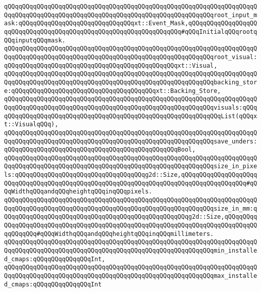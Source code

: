 \verb|qQQqqQQqqQQqqQQqqQQqqQQqqQQqqQQqqQQqqQQqqQQqqQQqqQQqqQQqqQQqqQQqqQQqqQQqqQQqqQQqqQQqqQQqqQQqqQQqqQQqqQQqqQQqqQQqqQQqqQQqqQQqqQQqroot_input_mask:qQQqqQQqqQQqqQQqqQQqqQQqqQQqqQQqxt::Event_Mask,qQQqqQQqqQQqqQQqqQQqqQQqqQQqqQQqqQQqqQQqqQQqqQQqqQQqqQQqqQQqqQQqqQQq#qQQqInitialqQQqrootqQQqinputqQQqmask.|\newline
\newline
\verb|qQQqqQQqqQQqqQQqqQQqqQQqqQQqqQQqqQQqqQQqqQQqqQQqqQQqqQQqqQQqqQQqqQQqqQQqqQQqqQQqqQQqqQQqqQQqqQQqqQQqqQQqqQQqqQQqqQQqqQQqqQQqqQQqroot_visual:qQQqqQQqqQQqqQQqqQQqqQQqqQQqqQQqqQQqqQQqqQQqqQQqxt::Visual,|\newline
\verb|qQQqqQQqqQQqqQQqqQQqqQQqqQQqqQQqqQQqqQQqqQQqqQQqqQQqqQQqqQQqqQQqqQQqqQQqqQQqqQQqqQQqqQQqqQQqqQQqqQQqqQQqqQQqqQQqqQQqqQQqqQQqqQQqbacking_store:qQQqqQQqqQQqqQQqqQQqqQQqqQQqqQQqqQQqqQQqxt::Backing_Store,|\newline
\newline
\verb|qQQqqQQqqQQqqQQqqQQqqQQqqQQqqQQqqQQqqQQqqQQqqQQqqQQqqQQqqQQqqQQqqQQqqQQqqQQqqQQqqQQqqQQqqQQqqQQqqQQqqQQqqQQqqQQqqQQqqQQqqQQqqQQqvisuals:qQQqqQQqqQQqqQQqqQQqqQQqqQQqqQQqqQQqqQQqqQQqqQQqqQQqqQQqqQQqqQQqList(qQQqxt::VisualqQQq),|\newline
\verb|qQQqqQQqqQQqqQQqqQQqqQQqqQQqqQQqqQQqqQQqqQQqqQQqqQQqqQQqqQQqqQQqqQQqqQQqqQQqqQQqqQQqqQQqqQQqqQQqqQQqqQQqqQQqqQQqqQQqqQQqqQQqqQQqsave_unders:qQQqqQQqqQQqqQQqqQQqqQQqqQQqqQQqqQQqqQQqqQQqqQQqBool,|\newline
\newline
\verb|qQQqqQQqqQQqqQQqqQQqqQQqqQQqqQQqqQQqqQQqqQQqqQQqqQQqqQQqqQQqqQQqqQQqqQQqqQQqqQQqqQQqqQQqqQQqqQQqqQQqqQQqqQQqqQQqqQQqqQQqqQQqqQQqsize_in_pixels:qQQqqQQqqQQqqQQqqQQqqQQqqQQqqQQqqQQqg2d::Size,qQQqqQQqqQQqqQQqqQQqqQQqqQQqqQQqqQQqqQQqqQQqqQQqqQQqqQQqqQQqqQQqqQQqqQQqqQQqqQQqqQQqqQQq#qQQqWidthqQQqandqQQqheightqQQqinqQQqpixels.|\newline
\verb|qQQqqQQqqQQqqQQqqQQqqQQqqQQqqQQqqQQqqQQqqQQqqQQqqQQqqQQqqQQqqQQqqQQqqQQqqQQqqQQqqQQqqQQqqQQqqQQqqQQqqQQqqQQqqQQqqQQqqQQqqQQqqQQqsize_in_mm:qQQqqQQqqQQqqQQqqQQqqQQqqQQqqQQqqQQqqQQqqQQqqQQqqQQqg2d::Size,qQQqqQQqqQQqqQQqqQQqqQQqqQQqqQQqqQQqqQQqqQQqqQQqqQQqqQQqqQQqqQQqqQQqqQQqqQQqqQQqqQQqqQQq#qQQqWidthqQQqandqQQqheightqQQqinqQQqmillimeters.|\newline
\newline
\verb|qQQqqQQqqQQqqQQqqQQqqQQqqQQqqQQqqQQqqQQqqQQqqQQqqQQqqQQqqQQqqQQqqQQqqQQqqQQqqQQqqQQqqQQqqQQqqQQqqQQqqQQqqQQqqQQqqQQqqQQqqQQqqQQqmin_installed_cmaps:qQQqqQQqqQQqqQQqInt,|\newline
\verb|qQQqqQQqqQQqqQQqqQQqqQQqqQQqqQQqqQQqqQQqqQQqqQQqqQQqqQQqqQQqqQQqqQQqqQQqqQQqqQQqqQQqqQQqqQQqqQQqqQQqqQQqqQQqqQQqqQQqqQQqqQQqqQQqmax_installed_cmaps:qQQqqQQqqQQqqQQqInt|\newline
